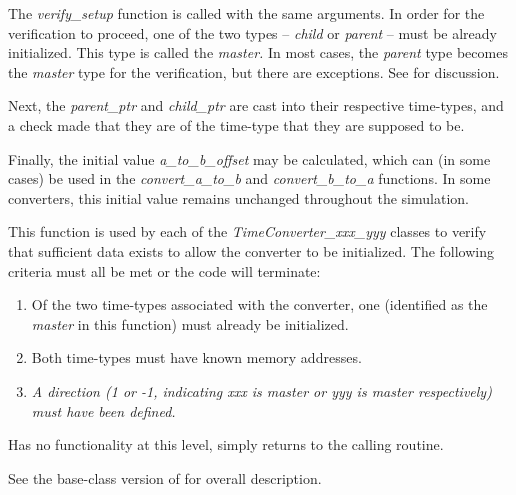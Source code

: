 {\begin{enumerate}
{\begin{enumerate}
\normalsize
The \textit{verify\_setup} function is called with the same arguments. 
In order for the verification to proceed, one of the two types --
\textit{child} or \textit{parent} -- must be already initialized.  This
type is called the\textit{ master.  }In most cases, the \textit{parent}
type becomes the \textit{master} type for the verification, but there
are exceptions.  See
for discussion.  

Next, the \textit{parent\_ptr} and \textit{child\_ptr} are cast into
their respective time-types, and a check made that they are of the
time-type that they are supposed to be.

Finally, the initial value \textit{a\_to\_b\_offset } may be calculated,
which can (in some cases) be used in the \textit{convert\_a\_to\_b} and
\textit{convert\_b\_to\_a} functions.  In some converters, this initial
value remains unchanged throughout the simulation.

This function is used by each of the \textit{TimeConverter\_xxx\_yyy} classes 
to verify that sufficient data exists to allow the converter to be
initialized.  The following criteria must all be met or the code will
terminate:

\begin{enumerate}
\item Of the two time-types associated with the converter, one
(identified as the \textit{master }in this function) must already be
initialized.
\item Both time-types must have known memory addresses.
\item {\itshape
\textup{A direction} (1 or -1, indicating xxx is master or yyy is master
respectively) \textup{must have been }\textup{defined.  }}
\end{enumerate}

Has no functionality at this level, simply returns to the calling routine.

\end{enumerate}}



{\begin{enumerate}
\label{ref:TimeConverterdyntaiinitialize}
See the base-class version of 
 for overall description.


\end{enumerate}}
\end{enumerate}}
